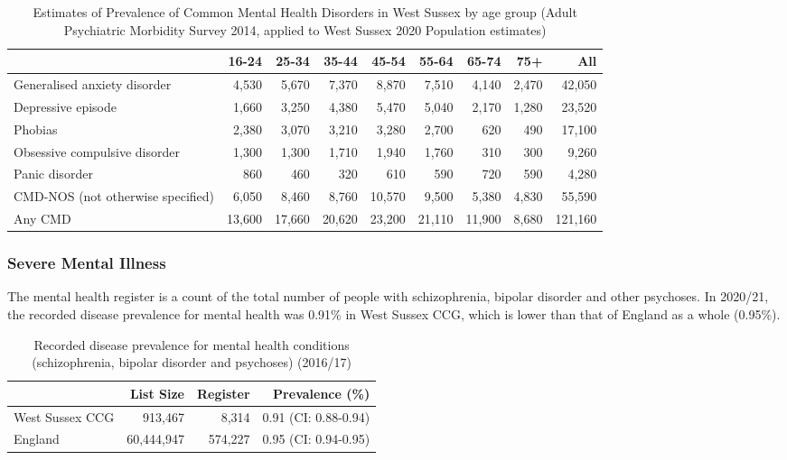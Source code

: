 \begin{table}
    \caption{Estimates of Prevalence of Common Mental Health Disorders in West Sussex by age group (Adult Psychiatric Morbidity Survey 2014, applied to West Sussex 2020 Population estimates)}
    \centering
    \begin{tabular}{lrrrrrrrr}
        \toprule
        \ & 16-24 & 25-34 & 35-44 & 45-54 & 55-64 & 65-74 & 75+ & All \\
        \midrule
        Generalised anxiety disorder & 4,530 & 5,670 & 7,370 & 8,870 & 7,510 & 4,140 & 2,470 & 42,050 \\
        Depressive episode & 1,660 & 3,250 & 4,380 & 5,470 & 5,040 & 2,170 & 1,280 & 23,520 \\
        Phobias & 2,380 & 3,070 & 3,210 & 3,280 & 2,700 & 620 & 490 & 17,100 \\
        Obsessive compulsive disorder & 1,300 & 1,300 & 1,710 & 1,940 & 1,760 & 310 & 300 & 9,260 \\
        Panic disorder & 860 & 460 & 320 & 610 & 590 & 720 & 590 & 4,280 \\
        CMD-NOS (not otherwise specified) & 6,050 & 8,460 & 8,760 & 10,570 & 9,500 & 5,380 & 4,830 & 55,590 \\
        Any CMD & 13,600 & 17,660 & 20,620 & 23,200 & 21,110 & 11,900 & 8,680 & 121,160 \\
        \bottomrule
    \end{tabular}
    \label{tab:wa:cmd}
\end{table}


 
\subsubsection{Severe Mental Illness} The mental health register is a count of the total number of people with schizophrenia, bipolar disorder and other psychoses. In 2020/21, the recorded disease prevalence for mental health was 0.91\% in West Sussex CCG, which is lower than that of England as a whole (0.95\%).

\begin{table}
    \caption{Recorded disease prevalence for mental health conditions (schizophrenia, bipolar disorder and psychoses) (2016/17)}
    \centering
    \begin{tabular}{lrrr}
        \toprule
        \ & List Size & Register & Prevalence (\%) \\
        \midrule
        West Sussex CCG & 913,467 & 8,314 & 0.91 (CI: 0.88-0.94) \\
        England & 60,444,947 & 574,227 & 0.95 (CI: 0.94-0.95) \\
        \bottomrule
    \end{tabular}
    \label{tab:wa:mhc}
\end{table}

